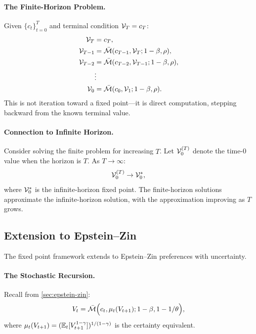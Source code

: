 \paragraph{The Finite-Horizon Problem.}
Given $\{c_t\}_{t=0}^{T}$ and terminal condition $\mathcal{V}_T = c_T$:
\begin{align}
\mathcal{V}_T &= c_T, \notag \\
\mathcal{V}_{T-1} &= \bar{\mathcal{M}}(c_{T-1}, \mathcal{V}_T; 1-\beta, \rho), \notag \\
\mathcal{V}_{T-2} &= \bar{\mathcal{M}}(c_{T-2}, \mathcal{V}_{T-1}; 1-\beta, \rho), \notag \\
&\vdots \notag \\
\mathcal{V}_0 &= \bar{\mathcal{M}}(c_0, \mathcal{V}_1; 1-\beta, \rho).
\label{eq:backward-induction-sequence}
\end{align}
This is not iteration toward a fixed point---it is direct computation, stepping backward from the known terminal value.

\paragraph{Connection to Infinite Horizon.}
Consider solving the finite problem for increasing $T$. Let $\mathcal{V}_0^{(T)}$ denote the time-0 value when the horizon is $T$. As $T \to \infty$:
\begin{equation}
\mathcal{V}_0^{(T)} \to \mathcal{V}_0^*,
\label{eq:finite-to-infinite}
\end{equation}
where $\mathcal{V}_0^*$ is the infinite-horizon fixed point. The finite-horizon solutions approximate the infinite-horizon solution, with the approximation improving as $T$ grows.

\subsection{Extension to Epstein--Zin}
\label{subsec:fixed-point-ez}

The fixed point framework extends to Epstein--Zin preferences with uncertainty.

\paragraph{The Stochastic Recursion.}
Recall from \cref{sec:epstein-zin}:
\begin{equation}
V_t = \bar{\mathcal{M}}\Big( c_t, \mu_t(V_{t+1}); 1-\beta, 1-1/\theta \Big),
\label{eq:ez-recursion-fp}
\end{equation}
where $\mu_t(V_{t+1}) = (\mathbb{E}_t[V_{t+1}^{1-\gamma}])^{1/(1-\gamma)}$ is the certainty equivalent.

